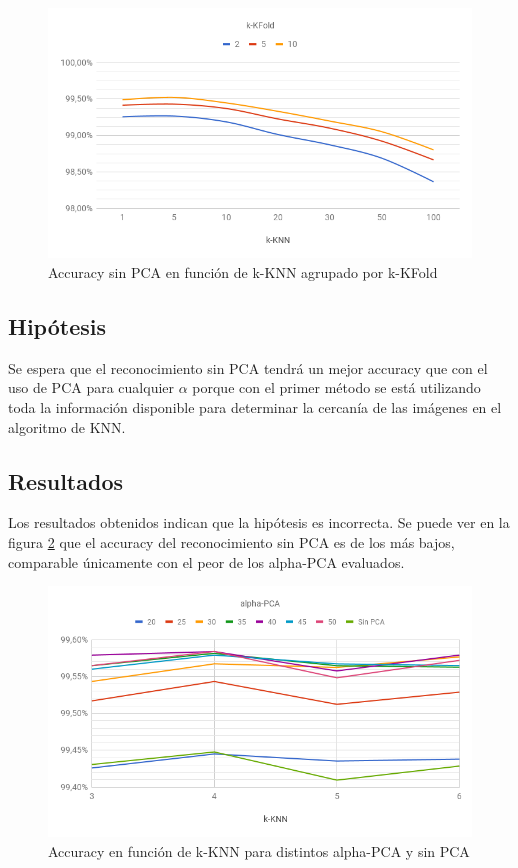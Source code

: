 \begin{figure}[H]
	\centering
	\includegraphics[width=\textwidth]{graficos/cv1_sin_pca_accuracy.png}
	\caption{Accuracy sin PCA en función de k-KNN agrupado por k-KFold}
	\label{fig:cv1_sin_pca_accuracy}
\end{figure}

\subsection{Hipótesis}

Se espera que el reconocimiento sin PCA tendrá un mejor accuracy que con el uso de PCA para cualquier $\alpha$ porque con el primer método se está utilizando toda la información disponible para determinar la cercanía de las imágenes en el algoritmo de KNN.

\subsection{Resultados}

Los resultados obtenidos indican que la hipótesis es incorrecta. Se puede ver en la figura \ref{fig:cv_vs} que el accuracy del reconocimiento sin PCA es de los más bajos, comparable únicamente con el peor de los alpha-PCA evaluados.

\begin{figure}[H]
    \centering
    \includegraphics[width=\textwidth]{graficos/cv_vs.png}
    \caption{Accuracy en función de k-KNN para distintos alpha-PCA y sin PCA}
    \label{fig:cv_vs}
\end{figure}


